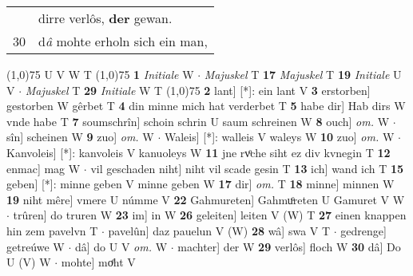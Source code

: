 \documentclass[8pt,a4paper,notitlepage]{article}
\begin{document}
\begin{table}[ht]
\begin{minipage}[t]{0.5\linewidth}
\begin{tabular}{rl}
 & dirre verlôs, \textbf{der} gewan.\\ 
30 & d\textit{â} mohte erholn sich ein man,\\ 
\end{tabular}
\scriptsize
\line(1,0){75} \newline
U V W T \newline
\line(1,0){75} \newline
\textbf{1} \textit{Initiale} W   $\cdot$ \textit{Majuskel} T  \textbf{17} \textit{Majuskel} T  \textbf{19} \textit{Initiale} U V   $\cdot$ \textit{Majuskel} T  \textbf{29} \textit{Initiale} W T  \newline
\line(1,0){75} \newline
\textbf{2} lant] [*]: ein lant V \textbf{3} erstorben] gestorben W gêrbet T \textbf{4} din minne mich hat verderbet T \textbf{5} habe dir] Hab dirs W vnde habe T \textbf{7} soumschrîn] schoin schrin U saum schreinen W \textbf{8} ouch] \textit{om.} W  $\cdot$ sîn] scheinen W \textbf{9} zuo] \textit{om.} W  $\cdot$ Waleis] [*]: walleis V waleys W \textbf{10} zuo] \textit{om.} W  $\cdot$ Kanvoleis] [*]: kanvoleis V kanuoleys W \textbf{11} jne rvͦche siht ez div kvnegin T \textbf{12} enmac] mag W  $\cdot$ vil geschaden niht] niht vil scade gesin T \textbf{13} ich] wand ich T \textbf{15} geben] [*]: minne geben V minne geben W \textbf{17} dir] \textit{om.} T \textbf{18} minne] minnen W \textbf{19} niht mêre] vmere U númme V \textbf{22} Gahmureten] Gahmuͦreten U Gamuret V W  $\cdot$ trûren] do truren W \textbf{23} im] in W \textbf{26} geleiten] leiten V (W) T \textbf{27} einen knappen hin zem pavelvn T  $\cdot$ pavelûn] daz pauelun V (W) \textbf{28} wâ] swa V T  $\cdot$ gedrenge] getreúwe W  $\cdot$ dâ] do U V \textit{om.} W  $\cdot$ machter] der W \textbf{29} verlôs] floch W \textbf{30} dâ] Do U (V) W  $\cdot$ mohte] moͤht V \newline
\end{minipage}
\end{table}
\end{document}

